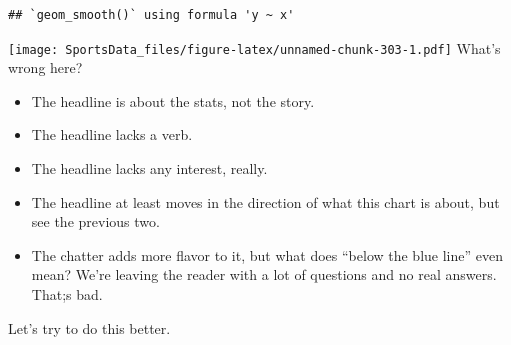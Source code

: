 \documentclass[
]{book}
\providecommand{\tightlist}{%
  \setlength{\itemsep}{0pt}\setlength{\parskip}{0pt}}
\begin{document}
\begin{verbatim}
## `geom_smooth()` using formula 'y ~ x'
\end{verbatim}

\texttt{[image: SportsData\_files/figure-latex/unnamed-chunk-303-1.pdf]}
What's wrong here?

\begin{itemize}
\tightlist
\item
  The headline is about the stats, not the story.
\item
  The headline lacks a verb.
\item
  The headline lacks any interest, really.
\item
  The headline at least moves in the direction of what this chart is about, but see the previous two.
\item
  The chatter adds more flavor to it, but what does ``below the blue line'' even mean? We're leaving the reader with a lot of questions and no real answers. That;s bad.
\end{itemize}

Let's try to do this better.
\end{document}
